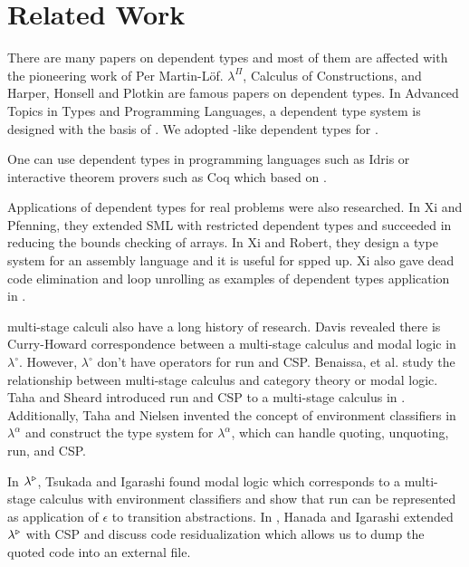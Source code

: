 \section{Related Work}


There are many papers on dependent types and most of them are affected with the pioneering work of Per Martin-L\"{o}f.
$\lambda^\Pi$\cite{Meyer1986}, Calculus of Constructions\cite{coquand:inria-00076024}, 
and Harper, Honsell and Plotkin\cite{harper1993framework} are famous papers on dependent types.
In Advanced Topics in Types and Programming Languages\cite{attapl},
a dependent type system \LLF is designed with the basis of \cite{harper1993framework}.
We adopted \cite{attapl}-like dependent types for \LMD.

One can use dependent types in programming languages such as Idris\cite{brady2013idris} or
interactive theorem provers such as Coq\cite{09thecoq} which based on \cite{coquand:inria-00076024}.


Applications of dependent types for real problems were also researched.
In Xi and Pfenning\cite{Xi98}, they extended SML with restricted dependent types
and succeeded in reducing the bounds checking of arrays.
In Xi and Robert\cite{xi2001dependently}, they design a type system for an assembly language and
it is useful for spped up.
Xi also gave dead code elimination and loop unrolling as examples of dependent types application in \cite{xi1999dependent}.


 multi-stage calculi also have a long history of research.
Davis revealed there is Curry-Howard correspondence between a multi-stage calculus and modal logic in $\lambda^\circ$\cite{davies1996temporal}.
However, $\lambda^\circ$ don't have operators for run and CSP.
Benaissa, et al. \cite{benaissa1999logical} study the relationship between multi-stage calculus and category theory or modal logic.
Taha and Sheard introduced run and CSP to a multi-stage calculus in \cite{MetaML}.
Additionally, Taha and Nielsen invented the concept of environment classifiers in $\lambda^\alpha$\cite{taha2003environment} and 
construct the type system for $\lambda^\alpha$, which can handle quoting, unquoting, run, and CSP.

In $\lambda^{\mathop{\triangleright}}$\cite{Tsukada}, Tsukada and Igarashi found modal logic which corresponds to a multi-stage calculus with environment classifiers and
show that run can be represented as application of $\epsilon$ to transition abstractions.
In \LTP\cite{Hanada2014}, Hanada and Igarashi extended $\lambda^{\mathop{\triangleright}}$ with CSP and discuss code residualization 
which allows us to dump the quoted code into an external file.

